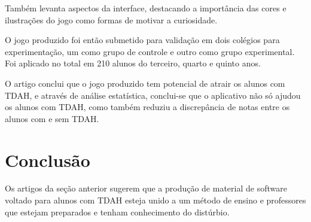 Também levanta aspectos da interface, destacando a importância das cores e ilustrações do jogo como formas de motivar a curiosidade. 

O jogo produzido foi então submetido para validação em dois colégios para experimentação, um como grupo de controle e outro como grupo experimental. Foi aplicado no total em 210 alunos do terceiro, quarto e quinto anos.

O artigo conclui que o jogo produzido tem potencial de atrair os alunos com TDAH, e através de análise estatística, conclui-se que o aplicativo não só ajudou os alunos com TDAH, como também reduziu a discrepância de notas entre os alunos com e sem TDAH.

\section{Conclusão}

Os artigos da seção anterior sugerem que a produção de material de software voltado para alunos com TDAH esteja unido a um método de ensino e professores que estejam preparados e tenham conhecimento do distúrbio. 

